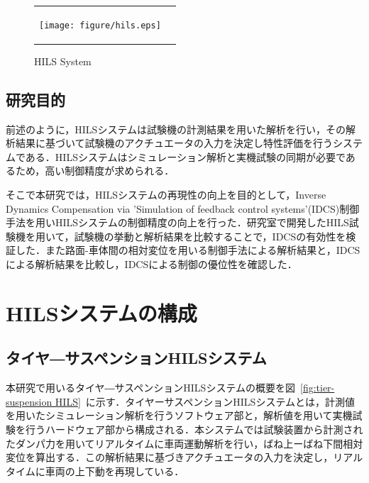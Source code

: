 \documentclass[a4paper,12pt]{article_vdlab_sotsuron}
\begin{document}

\vspace{10mm}
\begin{figure}[h!]
  \begin{tabular}{cc}
    \begin{minipage}{1.0\hsize}
      \begin{center}
	\texttt{[image: figure/hils.eps]}
	\caption{HILS System\cite{toyota_hils}}
	\label{fig:HILS system}
      \end{center}
     \end{minipage}
    \end{tabular}
\end{figure}

\subsection{研究目的}
前述のように，HILSシステムは試験機の計測結果を用いた解析を行い，その解析結果に基づいて試験機のアクチュエータの入力を決定し特性評価を行うシステムである．HILSシステムはシミュレーション解析と実機試験の同期が必要であるため，高い制御精度が求められる．

そこで本研究では，HILSシステムの再現性の向上を目的として，Inverse Dynamics Compensation via 'Simulation of feedback control systems'(IDCS)制御手法を用いHILSシステムの制御精度の向上を行った．研究室で開発したHILS試験機を用いて，試験機の挙動と解析結果を比較することで，IDCSの有効性を検証した．また路面-車体間の相対変位を用いる制御手法による解析結果と，IDCSによる解析結果を比較し，IDCSによる制御の優位性を確認した．


\newpage
\section{HILSシステムの構成}
\subsection{タイヤ―サスペンションHILSシステム}
本研究で用いるタイヤ―サスペンションHILSシステムの概要を図~\ref{fig:tier-suspension HILS}~に示す．タイヤーサスペンションHILSシステムとは，計測値を用いたシミュレーション解析を行うソフトウェア部と，解析値を用いて実機試験を行うハードウェア部から構成される．本システムでは試験装置から計測されたダンパ力を用いてリアルタイムに車両運動解析を行い，ばね上ーばね下間相対変位を算出する．この解析結果に基づきアクチュエータの入力を決定し，リアルタイムに車両の上下動を再現している．
\end{document}

